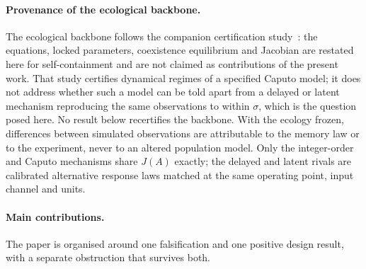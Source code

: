 \paragraph{Provenance of the ecological backbone.}
The ecological backbone follows the companion certification study~\cite{P01}: the equations, locked parameters, coexistence equilibrium and Jacobian are restated here for self-containment and are not claimed as contributions of the present work. That study certifies dynamical regimes of a specified Caputo model; it does not address whether such a model can be told apart from a delayed or latent mechanism reproducing the same observations to within $\sigma$, which is the question posed here. No result below recertifies the backbone. With the ecology frozen, differences between simulated observations are attributable to the memory law or to the experiment, never to an altered population model. Only the integer-order and Caputo mechanisms share $J(A)$ exactly; the delayed and latent rivals are calibrated alternative response laws matched at the same operating point, input channel and units.

\paragraph{Main contributions.}
The paper is organised around one falsification and one positive design result, with a separate obstruction that survives both.

